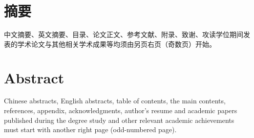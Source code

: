 
\maketitle%
\MAKETITLE%
\makedeclaration%
\intobmk\chapter*{摘\quad 要}%
\setcounter{page}{1}%

中文摘要、英文摘要、目录、论文正文、参考文献、附录、致谢、攻读学位期间发表的学术论文与其他相关学术成果等均须由另页右页（奇数页）开始。

\pagestyle{frontmatterstyle}%
\intobmk\chapter*{Abstract}%
\pagestyle{enfrontmatterstyle}%

Chinese abstracts, English abstracts, table of contents, the main contents, references, appendix, acknowledgments, author's resume and academic papers published during the degree study and other relevant academic achievements must start with another right page (odd-numbered page).



\cleardoublepage\pagestyle{frontmatterstyle}%

